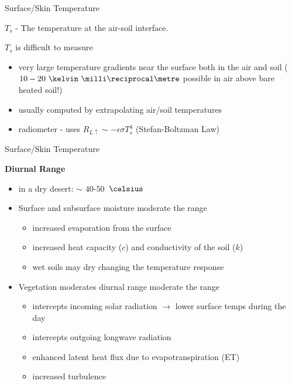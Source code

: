 \begin{frame}{Surface/Skin Temperature}
\begin{fancydefs}
	$T_s$  - The temperature at the air-soil interface.
\end{fancydefs}
$T_s$ is difficult to measure
\begin{itemize}
	\item very large temperature gradients near the surface both in the air and soil ($10-20\ \kelvin\ \milli\reciprocal\metre$ possible in air above bare heated soil!)
	\item usually computed by extrapolating air/soil temperatures
	\item radiometer - uses $R_{L\uparrow} \sim -\epsilon \sigma T_s^4$ (Stefan-Boltzman Law)
\end{itemize}
\end{frame}
\begin{frame}{Surface/Skin Temperature}

{\large \textbf{Diurnal Range}}
\begin{itemize}
	\item in a dry desert: $\sim$ $40$-$50$\ $\celsius$ 
	\item Surface and subsurface moisture moderate the range
	\begin{itemize}
		\item increased evaporation from the surface
		\item increased heat capacity ($c$) and conductivity of the soil ($k$)
		\item wet soils may dry changing the temperature response
	\end{itemize}
	\item Vegetation moderates diurnal range moderate the range
	\begin{itemize}
		\item intercepts incoming solar radiation $\rightarrow$ lower surface temps during the day
		\item intercepts outgoing longwave radiation
		\item enhanced latent heat flux due to evapotranspiration (ET) 
		\item increased turbulence
	\end{itemize}
\end{itemize}
\end{frame}

